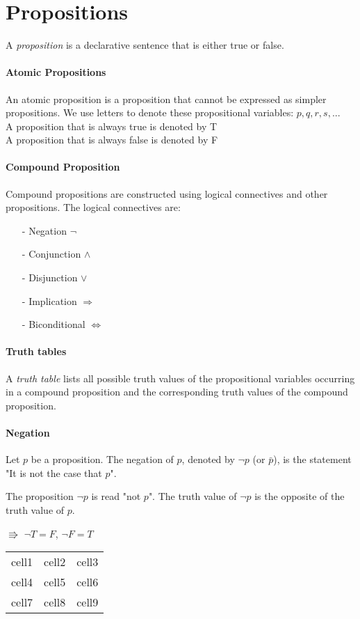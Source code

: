 \documentclass[10pt,a4paper]{book}
\begin{document}
\section{Propositions}
A \textit{proposition} is a declarative sentence that is either true or false.
\paragraph*{Atomic Propositions}
An atomic proposition is a proposition that cannot be expressed as simpler propositions. We use letters to denote these propositional variables: $p,q,r,s,...$\\
A proposition that is always true is denoted by T\\
A proposition that is always false is denoted by F
\paragraph*{Compound Proposition}
Compound propositions are constructed using logical connectives and other propositions. The logical connectives are:
\begin{itemize}
\item[-] Negation $\neg$
\item[-] Conjunction $\land$
\item[-] Disjunction $\lor$
\item[-] Implication $\Rightarrow$
\item[-] Biconditional $\Leftrightarrow$
\end{itemize}
\paragraph*{Truth tables}
A \textit{truth table} lists all possible truth values of the propositional variables occurring in a compound proposition and the corresponding truth values of the compound proposition.
\paragraph*{Negation}
Let $p$ be a proposition. The negation of $p$, denoted by $\neg p$ (or $\bar{p}$), is the statement "It is not the case that $p$".\par 
The proposition $\neg p$ is read "not $p$". The truth value of $\neg p$ is the opposite of the truth value of $p$. \par
$\Rrightarrow$ $\neg T = F$, $\neg F = T$
\begin{tabular}{ c c c }
 cell1 & cell2 & cell3 \\ 
 cell4 & cell5 & cell6 \\  
 cell7 & cell8 & cell9    
\end{tabular}
\end{document}
